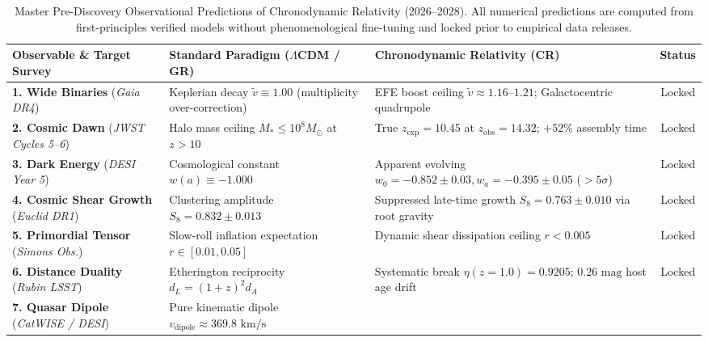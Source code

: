 \documentclass[aps,prd,reprint,superscriptaddress,nofootinbib,twocolumn,floatfix]{revtex4-2}
\begin{document}
\begin{table}[t]
\caption{\label{tab:master_predictions}Master Pre-Discovery Observational Predictions of Chronodynamic Relativity (2026--2028). All numerical predictions are computed from first-principles verified models without phenomenological fine-tuning and locked prior to empirical data releases.}
\begin{ruledtabular}
\footnotesize
\begin{tabular}{lllc}
\textbf{Observable \& Target Survey} & \textbf{Standard Paradigm ($\Lambda$CDM / GR)} & \textbf{Chronodynamic Relativity (CR)} & \textbf{Status} \\
\hline
\parbox[t]{4.3cm}{\textbf{1. Wide Binaries} (\textit{Gaia DR4})} &
\parbox[t]{4.9cm}{Keplerian decay $\tilde{v} \equiv 1.00$ (multiplicity over-correction)} &
\parbox[t]{5.8cm}{EFE boost ceiling $\tilde{v} \approx 1.16\text{--}1.21$; Galactocentric quadrupole} &
Locked \\
\hline
\parbox[t]{4.3cm}{\textbf{2. Cosmic Dawn} (\textit{JWST Cycles 5--6})} &
\parbox[t]{4.9cm}{Halo mass ceiling $M_* \le 10^8 M_\odot$ at $z > 10$} &
\parbox[t]{5.8cm}{True $z_{\text{exp}} = 10.45$ at $z_{\text{obs}} = 14.32$; $+52\%$ assembly time} &
Locked \\
\hline
\parbox[t]{4.3cm}{\textbf{3. Dark Energy} (\textit{DESI Year 5})} &
\parbox[t]{4.9cm}{Cosmological constant $w(a) \equiv -1.000$} &
\parbox[t]{5.8cm}{Apparent evolving $w_0 = -0.852 \pm 0.03, w_a = -0.395 \pm 0.05$ ($>5\sigma$)} &
Locked \\
\hline
\parbox[t]{4.3cm}{\textbf{4. Cosmic Shear Growth} (\textit{Euclid DR1})} &
\parbox[t]{4.9cm}{Clustering amplitude $S_8 = 0.832 \pm 0.013$} &
\parbox[t]{5.8cm}{Suppressed late-time growth $S_8 = 0.763 \pm 0.010$ via root gravity} &
Locked \\
\hline
\parbox[t]{4.3cm}{\textbf{5. Primordial Tensor} (\textit{Simons Obs.})} &
\parbox[t]{4.9cm}{Slow-roll inflation expectation $r \in [0.01, 0.05]$} &
\parbox[t]{5.8cm}{Dynamic shear dissipation ceiling $r < 0.005$} &
Locked \\
\hline
\parbox[t]{4.3cm}{\textbf{6. Distance Duality} (\textit{Rubin LSST})} &
\parbox[t]{4.9cm}{Etherington reciprocity $d_L = (1+z)^2 d_A$} &
\parbox[t]{5.8cm}{Systematic break $\eta(z=1.0) = 0.9205$; $0.26\text{ mag}$ host age drift} &
Locked \\
\hline
\parbox[t]{4.3cm}{\textbf{7. Quasar Dipole} (\textit{CatWISE / DESI})} &
\parbox[t]{4.9cm}{Pure kinematic dipole $v_{\text{dipole}} \approx 369.8\text{ km/s}$} &

\end{tabular}
\end{ruledtabular}
\end{table}
\end{document}
